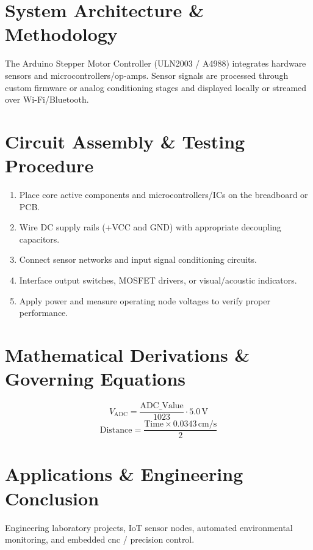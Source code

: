 \documentclass[11pt,a4paper]{article}
\begin{document}
\section{System Architecture \& Methodology}
The Arduino Stepper Motor Controller (ULN2003 / A4988) integrates hardware sensors and microcontrollers/op-amps. Sensor signals are processed through custom firmware or analog conditioning stages and displayed locally or streamed over Wi-Fi/Bluetooth.

\section{Circuit Assembly \& Testing Procedure}
\begin{enumerate}
    \item Place core active components and microcontrollers/ICs on the breadboard or PCB.
    \item Wire DC supply rails (+VCC and GND) with appropriate decoupling capacitors.
    \item Connect sensor networks and input signal conditioning circuits.
    \item Interface output switches, MOSFET drivers, or visual/acoustic indicators.
    \item Apply power and measure operating node voltages to verify proper performance.
\end{enumerate}

\section{Mathematical Derivations \& Governing Equations}
\begin{equation}
V_{\text{ADC}} = \frac{\text{ADC\_Value}}{1023} \cdot 5.0\,\text{V}
\end{equation}
\begin{equation}
\text{Distance} = \frac{\text{Time} \times 0.0343\,\text{cm/s}}{2}
\end{equation}

\section{Applications \& Engineering Conclusion}
Engineering laboratory projects, IoT sensor nodes, automated environmental monitoring, and embedded cnc / precision control.
\end{document}
